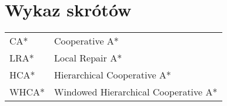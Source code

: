 \chapter*{Wykaz skrótów}

\begin{tabular}{l l}
CA* & Cooperative A* \\
LRA* & Local Repair A* \\
HCA* & Hierarchical Cooperative A* \\
WHCA* & Windowed Hierarchical Cooperative A* \\

\end{tabular}
